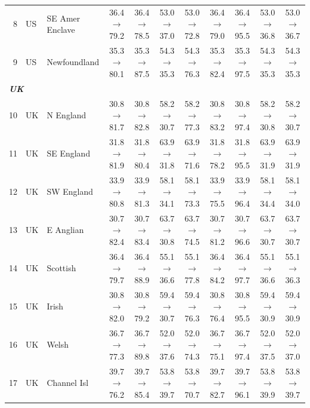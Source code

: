 \begin{table}[t]
{\begin{tabular}{rll c c c c c c c c}
8 & US & SE Amer Enclave & 36.4$\rightarrow$79.2 & 36.4$\rightarrow$78.5 & 53.0$\rightarrow$37.0 & 53.0$\rightarrow$72.8 & 36.4$\rightarrow$79.0 & 36.4$\rightarrow$95.5 & 53.0$\rightarrow$36.8 & 53.0$\rightarrow$36.7 \\
9 & US & Newfoundland & 35.3$\rightarrow$80.1 & 35.3$\rightarrow$87.5 & 54.3$\rightarrow$35.3 & 54.3$\rightarrow$76.3 & 35.3$\rightarrow$82.4 & 35.3$\rightarrow$97.5 & 54.3$\rightarrow$35.3 & 54.3$\rightarrow$35.3 \\
\midrule
\multicolumn{11}{l}{\textit{\textbf{UK}}} \\
10 & UK & N England & 30.8$\rightarrow$81.7 & 30.8$\rightarrow$82.8 & 58.2$\rightarrow$30.7 & 58.2$\rightarrow$77.3 & 30.8$\rightarrow$83.2 & 30.8$\rightarrow$97.4 & 58.2$\rightarrow$30.8 & 58.2$\rightarrow$30.7 \\
11 & UK & SE England & 31.8$\rightarrow$81.9 & 31.8$\rightarrow$80.4 & 63.9$\rightarrow$31.8 & 63.9$\rightarrow$71.6 & 31.8$\rightarrow$78.2 & 31.8$\rightarrow$95.5 & 63.9$\rightarrow$31.9 & 63.9$\rightarrow$31.9 \\
12 & UK & SW England & 33.9$\rightarrow$80.8 & 33.9$\rightarrow$81.3 & 58.1$\rightarrow$34.1 & 58.1$\rightarrow$73.3 & 33.9$\rightarrow$75.5 & 33.9$\rightarrow$96.4 & 58.1$\rightarrow$34.4 & 58.1$\rightarrow$34.0 \\
13 & UK & E Anglian & 30.7$\rightarrow$82.4 & 30.7$\rightarrow$83.4 & 63.7$\rightarrow$30.8 & 63.7$\rightarrow$74.5 & 30.7$\rightarrow$81.2 & 30.7$\rightarrow$96.6 & 63.7$\rightarrow$30.7 & 63.7$\rightarrow$30.7 \\
14 & UK & Scottish & 36.4$\rightarrow$79.7 & 36.4$\rightarrow$88.9 & 55.1$\rightarrow$36.6 & 55.1$\rightarrow$77.8 & 36.4$\rightarrow$84.2 & 36.4$\rightarrow$97.7 & 55.1$\rightarrow$36.6 & 55.1$\rightarrow$36.3 \\
15 & UK & Irish & 30.8$\rightarrow$82.0 & 30.8$\rightarrow$79.2 & 59.4$\rightarrow$30.7 & 59.4$\rightarrow$76.3 & 30.8$\rightarrow$76.4 & 30.8$\rightarrow$95.5 & 59.4$\rightarrow$30.9 & 59.4$\rightarrow$30.9 \\
16 & UK & Welsh & 36.7$\rightarrow$77.3 & 36.7$\rightarrow$89.8 & 52.0$\rightarrow$37.6 & 52.0$\rightarrow$74.3 & 36.7$\rightarrow$75.1 & 36.7$\rightarrow$97.4 & 52.0$\rightarrow$37.5 & 52.0$\rightarrow$37.0 \\
17 & UK & Channel Isl & 39.7$\rightarrow$76.2 & 39.7$\rightarrow$85.4 & 53.8$\rightarrow$39.7 & 53.8$\rightarrow$70.7 & 39.7$\rightarrow$82.7 & 39.7$\rightarrow$96.1 & 53.8$\rightarrow$39.9 & 53.8$\rightarrow$39.7 \\

\end{tabular}}
\end{table}
